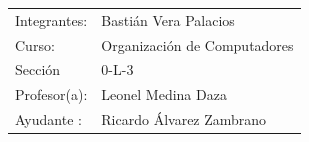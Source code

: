 \documentclass[12pt,letterpaper]{article}
\begin{document}
	\vspace*{6.25cm}
	\begin{flushright}
		\begin{tabular}[t]{l l}
			Integrantes: &Bastián Vera Palacios\\
			Curso: &Organización de Computadores\\
			Sección &0-L-3\\
			Profesor(a): &Leonel Medina Daza\\
			Ayudante : &Ricardo Álvarez Zambrano

		\end{tabular}
	\end{flushright}
	\begin{center}
		\vspace{1.5cm}
		\Today
	\end{center}

\newpage
\tableofcontents
\thispagestyle{empty}

\newpage
\renewcommand{\thepage}{\arabic{page}}
\setcounter{page}{1}







\clearpage
{}


\end{document}
